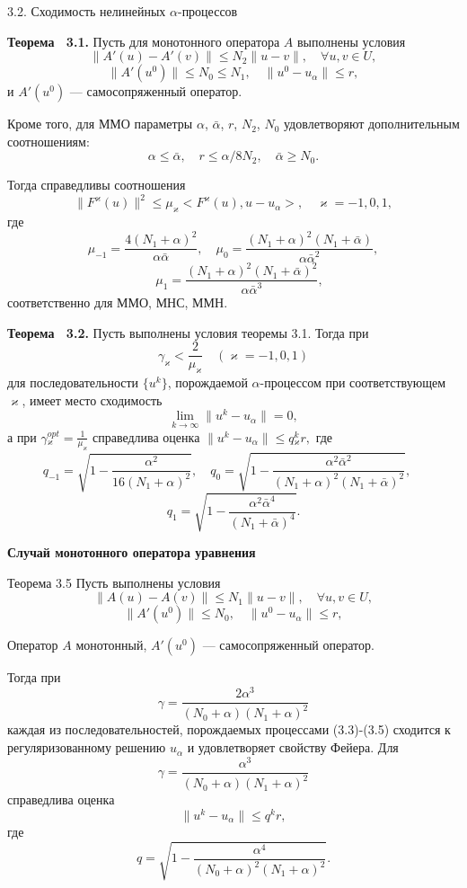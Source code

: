 \documentclass[10pt,pdf, mathserif, hyperref={unicode}]{beamer}
\begin{document}
\begin{frame}{3.2. Сходимость нелинейных $\alpha$-процессов}
	\begin{block}{\bf Теорема ~3.1.}
		Пусть для монотонного оператора $A$ выполнены условия $$\|A'(u)-A'(v)\|\le N_2\|u-v\|, \quad \forall u, v \in U,	$$$$\|A'(u^0)\| \le N_0\le N_1, \quad \|u^0-u_\alpha\| \le r,$$ и $A'(u^0)$ --- самосопряженный оператор. 
		
		Кроме того, для ММО параметры $\alpha$, $\bar\alpha$, $r$, $N_2$, $N_0$ удовлетворяют дополнительным соотношениям:
		$$\alpha \le \bar\alpha, \quad r\le \alpha/8N_2, \quad \bar\alpha \ge N_0.$$
		
		Тогда справедливы соотношения
		$$\|F^\varkappa(u)\|^2 \le \mu_\varkappa<F^\varkappa(u), u-u_\alpha>, \quad \varkappa=-1,0,1,$$ где
		$$
		\mu _{-1}=\frac{4(N_1+\alpha)^2}{\alpha\bar\alpha}, \quad \mu _0= \frac{(N_1+\alpha)^2(N_1+\bar\alpha)}{\alpha{\bar\alpha}^2}, $$$$\quad \mu_1= \frac{(N_1+\alpha)^2(N_1+\bar\alpha)^2}{\alpha{\bar\alpha}^3},
		$$
		соответственно для ММО, МНС, ММН.
	\end{block}
\end{frame}
\begin{frame}
	\begin{block}{\bf Теорема ~3.2.}
		Пусть выполнены условия теоремы 3.1. Тогда при
		$$\gamma _\varkappa <\frac{2}{\mu _\varkappa}\quad (\varkappa=-1,0,1)$$
		для последовательности $\{u^k\}$, порождаемой $\alpha$-процессом при соответствующем $\varkappa$, имеет место сходимость $$\lim_{k\to\infty}\|u^k-u_\alpha\|=0, $$ а при 
		$\gamma{_\varkappa^{opt}}=\frac{1}{\mu_\varkappa}$
		справедлива оценка $\|u^k-u_\alpha\|\le q{_\varkappa^k}r,$ где
		$$
		q_{-1}=\sqrt{1-\frac{\alpha^2}{16(N_1+\alpha)^2}}, \quad q_0=\sqrt{1-\frac{\alpha^2\bar\alpha^2}{(N_1+\alpha)^2(N_1+\bar\alpha)^2}}, \quad $$$$q_1=\sqrt{1-\frac{\alpha^2\bar\alpha^4}{(N_1+\bar\alpha)^4}}.
		$$
	\end{block}
\end{frame}
\begin{frame}{\small\textbf{Случай монотонного оператора уравнения}}
	\begin{block}{Теорема 3.5}
		Пусть выполнены условия $$\|A(u)-A(v)\|\le N_1\|u-v\|,  \quad \forall u, v \in U,$$ 
		$$\|A'(u^0)\| \le N_0, \quad \|u^0-u_\alpha\| \le r,$$ 
		
		\smallskip
		Оператор $A$ монотонный, $A'(u^0)$ --- самосопряженный оператор.
		
		\smallskip
		Тогда при $$\gamma=\frac{2\alpha^3}{(N_0+\alpha)(N_1+\alpha)^2}$$ каждая из последовательностей, порождаемых процессами (3.3)-(3.5) сходится к регуляризованному решению $u_\alpha$ и удовлетворяет свойству Фейера.
		Для $$\gamma=\frac{\alpha^3}{(N_0+\alpha)(N_1+\alpha)^2}$$ справедлива оценка
		$$\|u^k-u_\alpha\|\le q^k r,$$ где
		$$q=\sqrt{1-\frac{\alpha^4}{(N_0+\alpha)^2(N_1+\alpha)^2}}.$$
	\end{block}
\end{frame}
\end{document}
